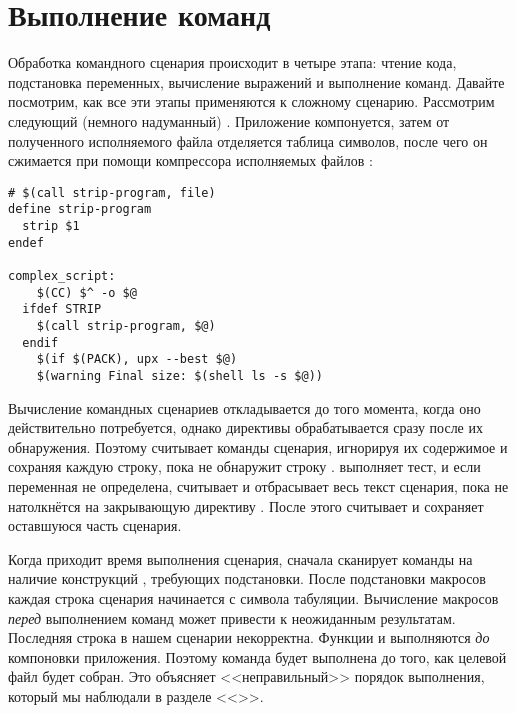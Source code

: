 \section{Выполнение команд}
\label{sec:evaluating_commands}

Обработка командного сценария происходит в четыре этапа: чтение кода,
подстановка переменных, вычисление выражений \GNUmake{} и выполнение
команд. Давайте посмотрим, как все эти этапы применяются к сложному
сценарию. Рассмотрим следующий (немного надуманный) \Makefile{}.
Приложение компонуется, затем от полученного исполняемого файла
отделяется таблица символов, после чего он сжимается при помощи
компрессора исполняемых файлов :

{\footnotesize
\begin{verbatim}
# $(call strip-program, file)
define strip-program
  strip $1
endef

complex_script:
    $(CC) $^ -o $@
  ifdef STRIP
    $(call strip-program, $@)
  endif
    $(if $(PACK), upx --best $@)
    $(warning Final size: $(shell ls -s $@))
\end{verbatim}
}

Вычисление командных сценариев откладывается до того момента, когда
оно действительно потребуется, однако директивы 
обрабатывается сразу после их обнаружения. Поэтому \GNUmake{}
считывает команды сценария, игнорируя их содержимое и сохраняя каждую
строку, пока не обнаружит строку . \GNUmake{}
выполняет тест, и если переменная  не определена,
\GNUmake{} считывает и отбрасывает весь текст сценария, пока не
натолкнётся на закрывающую директиву . После этого
\GNUmake{} считывает и сохраняет оставшуюся часть сценария.

Когда приходит время выполнения сценария, \GNUmake{} сначала сканирует
команды на наличие конструкций \GNUmake{}, требующих подстановки. После
подстановки макросов каждая строка сценария начинается с символа
табуляции. Вычисление макросов \emph{перед} выполнением команд может
привести к неожиданным результатам. Последняя строка в нашем сценарии
некорректна. Функции  и  выполняются
\emph{до} компоновки приложения. Поэтому команда  будет
выполнена до того, как целевой файл будет собран. Это объясняет
<<неправильный>> порядок выполнения, который мы наблюдали в разделе
<<>>.

